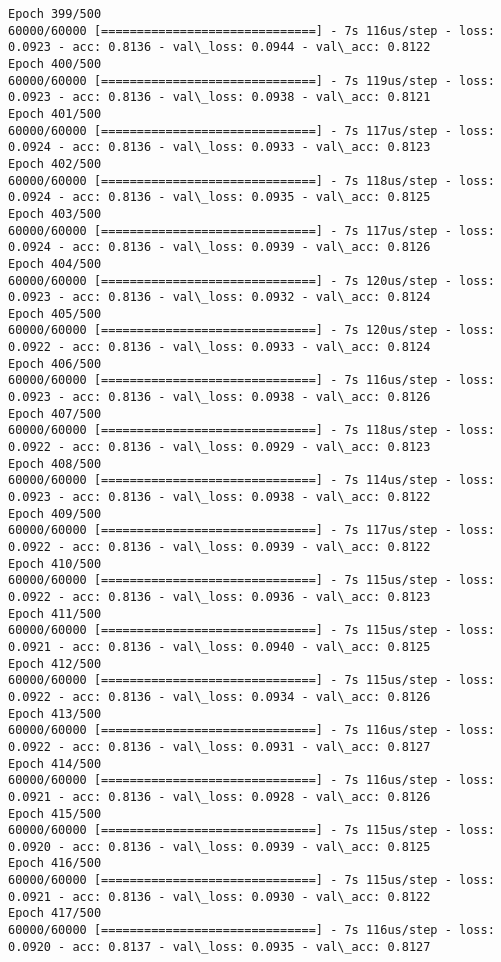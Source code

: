 \documentclass[11pt]{article}
\begin{document}
\begin{Verbatim}[commandchars=\\\{\}]
Epoch 399/500
60000/60000 [==============================] - 7s 116us/step - loss: 0.0923 - acc: 0.8136 - val\_loss: 0.0944 - val\_acc: 0.8122
Epoch 400/500
60000/60000 [==============================] - 7s 119us/step - loss: 0.0923 - acc: 0.8136 - val\_loss: 0.0938 - val\_acc: 0.8121
Epoch 401/500
60000/60000 [==============================] - 7s 117us/step - loss: 0.0924 - acc: 0.8136 - val\_loss: 0.0933 - val\_acc: 0.8123
Epoch 402/500
60000/60000 [==============================] - 7s 118us/step - loss: 0.0924 - acc: 0.8136 - val\_loss: 0.0935 - val\_acc: 0.8125
Epoch 403/500
60000/60000 [==============================] - 7s 117us/step - loss: 0.0924 - acc: 0.8136 - val\_loss: 0.0939 - val\_acc: 0.8126
Epoch 404/500
60000/60000 [==============================] - 7s 120us/step - loss: 0.0923 - acc: 0.8136 - val\_loss: 0.0932 - val\_acc: 0.8124
Epoch 405/500
60000/60000 [==============================] - 7s 120us/step - loss: 0.0922 - acc: 0.8136 - val\_loss: 0.0933 - val\_acc: 0.8124
Epoch 406/500
60000/60000 [==============================] - 7s 116us/step - loss: 0.0923 - acc: 0.8136 - val\_loss: 0.0938 - val\_acc: 0.8126
Epoch 407/500
60000/60000 [==============================] - 7s 118us/step - loss: 0.0922 - acc: 0.8136 - val\_loss: 0.0929 - val\_acc: 0.8123
Epoch 408/500
60000/60000 [==============================] - 7s 114us/step - loss: 0.0923 - acc: 0.8136 - val\_loss: 0.0938 - val\_acc: 0.8122
Epoch 409/500
60000/60000 [==============================] - 7s 117us/step - loss: 0.0922 - acc: 0.8136 - val\_loss: 0.0939 - val\_acc: 0.8122
Epoch 410/500
60000/60000 [==============================] - 7s 115us/step - loss: 0.0922 - acc: 0.8136 - val\_loss: 0.0936 - val\_acc: 0.8123
Epoch 411/500
60000/60000 [==============================] - 7s 115us/step - loss: 0.0921 - acc: 0.8136 - val\_loss: 0.0940 - val\_acc: 0.8125
Epoch 412/500
60000/60000 [==============================] - 7s 115us/step - loss: 0.0922 - acc: 0.8136 - val\_loss: 0.0934 - val\_acc: 0.8126
Epoch 413/500
60000/60000 [==============================] - 7s 116us/step - loss: 0.0922 - acc: 0.8136 - val\_loss: 0.0931 - val\_acc: 0.8127
Epoch 414/500
60000/60000 [==============================] - 7s 116us/step - loss: 0.0921 - acc: 0.8136 - val\_loss: 0.0928 - val\_acc: 0.8126
Epoch 415/500
60000/60000 [==============================] - 7s 115us/step - loss: 0.0920 - acc: 0.8136 - val\_loss: 0.0939 - val\_acc: 0.8125
Epoch 416/500
60000/60000 [==============================] - 7s 115us/step - loss: 0.0921 - acc: 0.8136 - val\_loss: 0.0930 - val\_acc: 0.8122
Epoch 417/500
60000/60000 [==============================] - 7s 116us/step - loss: 0.0920 - acc: 0.8137 - val\_loss: 0.0935 - val\_acc: 0.8127

\end{Verbatim}
\end{document}
